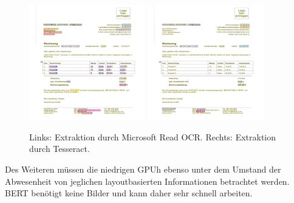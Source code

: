 \begin{figure}[]
    \centering
    \includegraphics[width=0.45\textwidth,height=0.4\textheight,keepaspectratio=false]{graphics/ms_read.png}
    \hfill %
    \hfill
    \includegraphics[width=0.45\textwidth,height=0.4\textheight,keepaspectratio=false]{graphics/tesseract.png}
    \caption{Links: Extraktion durch Microsoft Read OCR. Rechts: Extraktion durch Tesseract.}
    \label{fig:ocr_results}
\end{figure}

Des Weiteren müssen die niedrigen GPUh ebenso unter dem Umstand der Abwesenheit von jeglichen layoutbasierten Informationen betrachtet werden. BERT benötigt keine Bilder und kann daher sehr schnell arbeiten.

